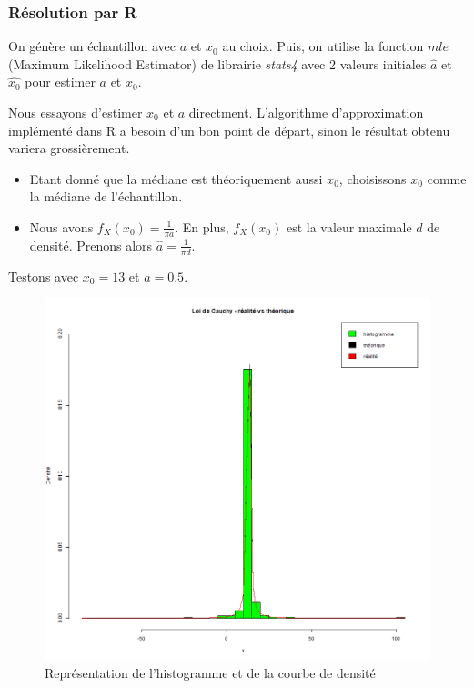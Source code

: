 \documentclass[12pt,a4paper,titlepage]{article}
\numberwithin{equation}{section}
\begin{document}
\subsubsection*{Résolution par R}

On génère un échantillon avec $a$ et $x_0$ au choix. Puis, on utilise la fonction $mle$ (Maximum Likelihood Estimator) de librairie \emph{stats4} avec 2 valeurs initiales $\hat{a}$ et $\hat{x_0}$ pour estimer $a$ et $x_0$.

Nous essayons d'estimer $x_0$ et $a$ directment. L'algorithme d'approximation implémenté dans R a besoin d'un bon point de départ, sinon le résultat obtenu variera grossièrement.
\begin{itemize}
\item Etant donné que la médiane est théoriquement aussi $x_0$, choisissons $x_0$ comme la médiane de l'échantillon.
\item Nous avons ${f_X}\left( {{x_0}} \right) = \frac{1}{{\pi a}}$. En plus, $f_X(x_0)$ est la valeur maximale $d$ de densité. Prenons alors $\hat a = \frac{1}{{\pi d}}$.
\end{itemize}

Testons avec $x_0=13$ et $a=0.5$.



\begin{figure}[h]
\includegraphics[width=\linewidth]{images/Cauchy_real_vs_theo.png}
\caption{Représentation de l'histogramme et de la courbe de densité}
\end{figure}
\end{document}
